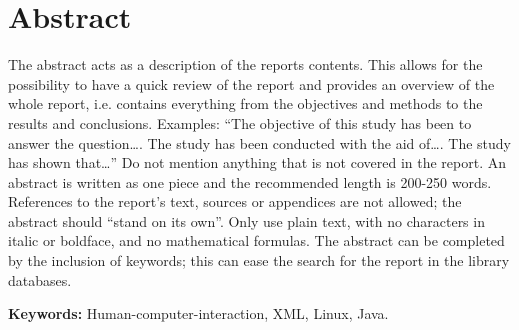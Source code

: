 \pagebreak
\section*{Abstract}
\label{ch:eng-abstract}
The abstract acts as a description of the reports contents. This allows for the possibility to have a quick review of the report and provides an overview of the whole report, i.e. contains everything from the objectives and methods to the results and conclusions. Examples: “The objective of this study has been to answer the question…. The study has been conducted with the aid of…. The study has shown that…” Do not mention anything that is not covered in the report. An abstract is written as one piece and the recommended length is 200-250 words. References to the report's text, sources or appendices are not allowed; the abstract should “stand on its own”. Only use plain text, with no characters in italic or boldface, and no mathematical formulas. The abstract can be completed by the inclusion of keywords; this can ease the search for the report in the library databases.

\textbf{Keywords:} Human-computer-interaction, XML, Linux, Java.
